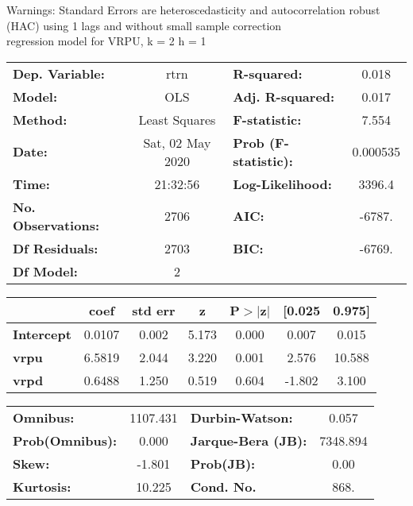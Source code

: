 Warnings: \newline
 [1] Standard Errors are heteroscedasticity and autocorrelation robust (HAC) using 1 lags and without small sample correction\\ 

regression model for VRPU, k = 2 h = 1\begin{center}
\begin{tabular}{lclc}
\toprule
\textbf{Dep. Variable:}    &       rtrn       & \textbf{  R-squared:         } &     0.018   \\
\textbf{Model:}            &       OLS        & \textbf{  Adj. R-squared:    } &     0.017   \\
\textbf{Method:}           &  Least Squares   & \textbf{  F-statistic:       } &     7.554   \\
\textbf{Date:}             & Sat, 02 May 2020 & \textbf{  Prob (F-statistic):} &  0.000535   \\
\textbf{Time:}             &     21:32:56     & \textbf{  Log-Likelihood:    } &    3396.4   \\
\textbf{No. Observations:} &        2706      & \textbf{  AIC:               } &    -6787.   \\
\textbf{Df Residuals:}     &        2703      & \textbf{  BIC:               } &    -6769.   \\
\textbf{Df Model:}         &           2      & \textbf{                     } &             \\
\bottomrule
\end{tabular}
\begin{tabular}{lcccccc}
                   & \textbf{coef} & \textbf{std err} & \textbf{z} & \textbf{P$> |$z$|$} & \textbf{[0.025} & \textbf{0.975]}  \\
\midrule
\textbf{Intercept} &       0.0107  &        0.002     &     5.173  &         0.000        &        0.007    &        0.015     \\
\textbf{vrpu}      &       6.5819  &        2.044     &     3.220  &         0.001        &        2.576    &       10.588     \\
\textbf{vrpd}      &       0.6488  &        1.250     &     0.519  &         0.604        &       -1.802    &        3.100     \\
\bottomrule
\end{tabular}
\begin{tabular}{lclc}
\textbf{Omnibus:}       & 1107.431 & \textbf{  Durbin-Watson:     } &    0.057  \\
\textbf{Prob(Omnibus):} &   0.000  & \textbf{  Jarque-Bera (JB):  } & 7348.894  \\
\textbf{Skew:}          &  -1.801  & \textbf{  Prob(JB):          } &     0.00  \\
\textbf{Kurtosis:}      &  10.225  & \textbf{  Cond. No.          } &     868.  \\
\bottomrule
\end{tabular}
\end{center}


